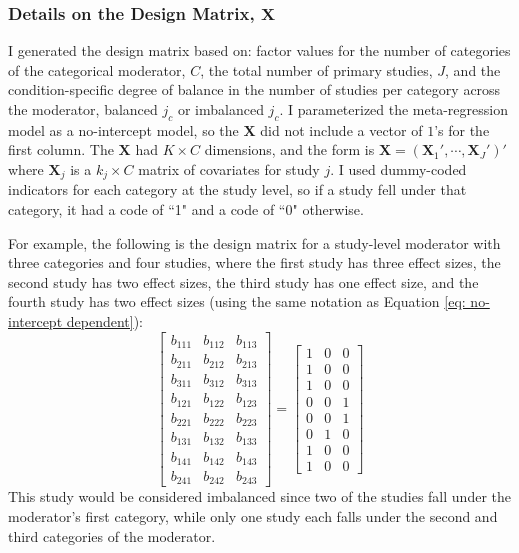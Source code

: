 \subsubsection{Details on the Design Matrix, $\bm{X}$}
I generated the design matrix based on: factor values for the number of categories of the categorical moderator, $C$, the total number of primary studies, $J$, and the condition-specific degree of balance in the number of studies per category across the moderator, balanced $j_c$ or imbalanced $j_c$. I parameterized the meta-regression model as a no-intercept model, so the $\bm{X}$ did not include a vector of $1$'s for the first column. The $\bm{X}$ had $K \times C$ dimensions, and the form is $\bm{X} = (\bm{X}_1', \cdots, \bm{X}_J')'$ where $\bm{X}_j$ is a $k_j \times C$ matrix of covariates for study $j$. I used dummy-coded indicators for each category at the study level, so if a study fell under that category, it had a code of ``1" and a code of ``0" otherwise. 

For example, the following is the design matrix for a study-level moderator with three categories and four studies, where the first study has three effect sizes, the second study has two effect sizes, the third study has one effect size, and the fourth study has two effect sizes (using the same notation as Equation \ref{eq: no-intercept dependent}): 
\begin{equation}
  \begin{bmatrix}
    b_{111} & b_{112} & b_{113} \\
    b_{211} & b_{212} & b_{213} \\
    b_{311} & b_{312} & b_{313} \\
    b_{121} & b_{122} & b_{123} \\
    b_{221} & b_{222} & b_{223} \\
    b_{131} & b_{132} & b_{133} \\
    b_{141} & b_{142} & b_{143} \\
    b_{241} & b_{242} & b_{243} 
   \end{bmatrix} = 
   \begin{bmatrix}
    1 & 0  & 0 \\
    1 & 0  & 0 \\
    1 & 0  & 0 \\
    0 & 0  & 1 \\
    0 & 0  & 1 \\
    0 & 1  & 0 \\
    1 & 0  & 0 \\
    1 & 0  & 0 
   \end{bmatrix} 
   \nonumber
\end{equation}
This study would be considered imbalanced since two of the studies fall under the moderator's first category, while only one study each falls under the second and third categories of the moderator. 

